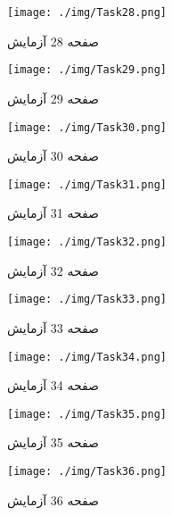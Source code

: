 {    %
    \begin{figure}[htpb]
        \centering
        \texttt{[image: ./img/Task28.png]}
        \caption{ صفحه 28 آزمایش }
        \label{fig:Task28}
    \end{figure}


    \begin{figure}[htpb]
        \centering
        \texttt{[image: ./img/Task29.png]}
        \caption{ صفحه 29 آزمایش }
        \label{fig:Task29}
    \end{figure}


    \begin{figure}[htpb]
        \centering
        \texttt{[image: ./img/Task30.png]}
        \caption{ صفحه 30 آزمایش }
        \label{fig:Task30}
    \end{figure}


    \begin{figure}[htpb]
        \centering
        \texttt{[image: ./img/Task31.png]}
        \caption{ صفحه 31 آزمایش }
        \label{fig:Task31}
    \end{figure}


    \begin{figure}[htpb]
        \centering
        \texttt{[image: ./img/Task32.png]}
        \caption{ صفحه 32 آزمایش }
        \label{fig:Task32}
    \end{figure}


    \begin{figure}[htpb]
        \centering
        \texttt{[image: ./img/Task33.png]}
        \caption{ صفحه 33 آزمایش }
        \label{fig:Task33}
    \end{figure}


    \begin{figure}[htpb]
        \centering
        \texttt{[image: ./img/Task34.png]}
        \caption{ صفحه 34 آزمایش }
        \label{fig:Task34}
    \end{figure}


    \begin{figure}[htpb]
        \centering
        \texttt{[image: ./img/Task35.png]}
        \caption{ صفحه 35 آزمایش }
        \label{fig:Task35}
    \end{figure}


    \begin{figure}[htpb]
        \centering
        \texttt{[image: ./img/Task36.png]}
        \caption{ صفحه 36 آزمایش }
        \label{fig:Task36}
    \end{figure}


}
